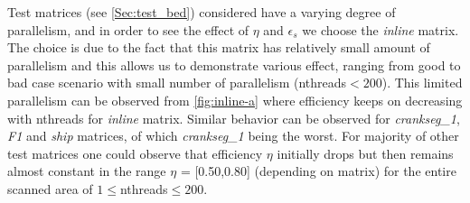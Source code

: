 Test matrices (see \cref{Sec:test_bed}) considered have a varying degree of parallelism, and in order to see the effect of $\eta$ and $\epsilon_s$ we choose the \emph{inline} matrix. The choice is due to the fact that this matrix has relatively small amount of parallelism and this allows us to demonstrate various effect, ranging from good to bad case scenario with small number of parallelism (\acrshort{nthreads}$ < 200$). This limited parallelism can be observed from \cref{fig:inline-a} 
where efficiency keeps on decreasing with \acrshort{nthreads} for \emph{inline} matrix. Similar behavior can be observed for \emph{crankseg\_1}, \emph{F1} and \emph{ship} matrices, of which \emph{crankseg\_1} being the worst. For majority of other test matrices one could observe that efficiency $\eta$ initially drops but then remains almost constant in the range $\eta$ = [0.50,0.80] (depending on matrix) for the entire scanned area of $1 \leq $\acrshort{nthreads}$ \leq 200$.


